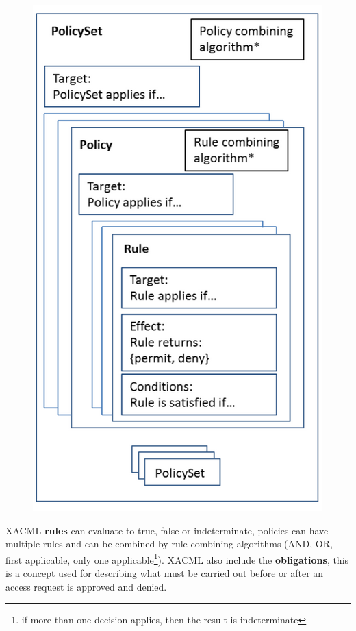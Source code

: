 \begin{figure}[h!]
    \centering
    \includegraphics[scale=0.35]{images/policy.png}
\end{figure}

\FloatBarrier
XACML \textbf{rules} can evaluate to true, false or indeterminate, policies can have multiple rules and can be combined by rule combining algorithms (AND, OR, first applicable, only one applicable\footnote{if more than one decision applies, then the result is indeterminate}). XACML also include the \textbf{obligations}, this is a concept used for describing what must be carried out before or after an access request is approved and denied.

